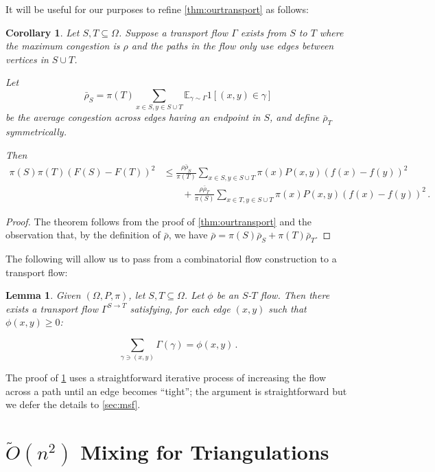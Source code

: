 \documentclass[a4paper, 12p]{article}
\numberwithin{equation}{section}
\newcommand{\Exp}{\mathbb{E}}
\newcommand{\FF}{F}
\newtheorem{lemma}[theorem]{Lemma}
\newtheorem{corollary}[theorem]{Corollary}
\begin{document}
It will be useful for our purposes to refine \cref{thm:ourtransport} as follows:
\begin{corollary}\label{cor:bettertransport}
Let $S, T \subseteq \Omega$. Suppose a transport flow $\Gamma$ exists from $S$ to $T$ where the maximum congestion is $\rho$ and the paths in the flow only use edges between vertices in $S \cup T$.

Let
\[
    \bar\rho_S =  \pi(T)\sum_{x \in S, y \in S \cup T} \Exp_{\gamma \sim \Gamma}  1[(x, y) \in \gamma]
\]
be the average congestion across edges having an endpoint in $S$, and define $\bar\rho_T$ symmetrically.

Then
\begin{align}
    \pi(S)\pi(T)(\FF(S) - \FF(T))^2 &\leq \frac{\rho \bar\rho_S}{\pi(T)}\sum_{x \in S, y \in S \cup T}\pi(x)P(x, y)(f(x) - f(y))^2 \nonumber \\
    &\quad\quad+ \frac{\rho \bar\rho_T}{\pi(S)}\sum_{x \in T, y \in S \cup T}\pi(x)P(x, y)(f(x) - f(y))^2\,.\label{eqn:bettertransport}
\end{align}
\end{corollary}
\begin{proof}
    The theorem follows from the proof of \cref{thm:ourtransport} and the observation that, by the definition of $\bar\rho$, we have
    $\bar\rho = \pi(S)\bar\rho_S + \pi(T)\bar\rho_T$.
\end{proof}

The following will allow us to pass from a combinatorial flow construction to a transport flow:
\begin{lemma}
    Given $(\Omega, P, \pi)$, let $S, T \subseteq \Omega$. Let $\phi$ be an $S$-$T$ flow. Then there exists a transport flow $\Gamma^{S\rightarrow T}$ satisfying, for each edge $(x, y)$ such that $\phi(x, y) \geq 0$:

    \[
        \sum_{\gamma \ni (x, y)}\Gamma(\gamma) = \phi(x, y)\,.
    \]
    \label{lem:flowtotransportflow}
\end{lemma}
The proof of \cref{lem:flowtotransportflow} uses a straightforward iterative process of increasing the flow across a path until an edge becomes ``tight''; the argument is straightforward but we defer the details to \cref{sec:msf}.

\section{$\widetilde{O}(n^{2})$ Mixing for Triangulations}
\label{sec:trimixing}
\end{document}
